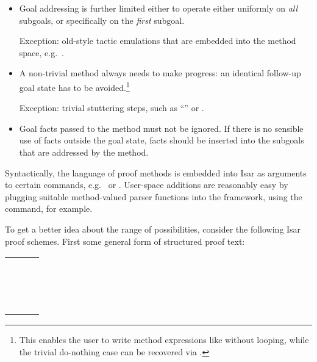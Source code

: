 \begin{isabellebody}
\begin{isamarkuptext}
  \begin{itemize}

  \item Goal addressing is further limited either to operate either
  uniformly on \emph{all} subgoals, or specifically on the
  \emph{first} subgoal.

  Exception: old-style tactic emulations that are embedded into the
  method space, e.g.\ \hyperlink{method.rule-tac}{\mbox{}}.

  \item A non-trivial method always needs to make progress: an
  identical follow-up goal state has to be avoided.\footnote{This
  enables the user to write method expressions like 
  without looping, while the trivial do-nothing case can be recovered
  via .}

  Exception: trivial stuttering steps, such as ``\hyperlink{method.-}{\mbox{\isa{{\isacharminus}}}}'' or
  \hyperlink{method.succeed}{\mbox{}}.

  \item Goal facts passed to the method must not be ignored.  If there
  is no sensible use of facts outside the goal state, facts should be
  inserted into the subgoals that are addressed by the method.

  \end{itemize}

  \medskip Syntactically, the language of proof methods is embedded
  into Isar as arguments to certain commands, e.g.\ \hyperlink{command.by}{\mbox{}} or
  \hyperlink{command.apply}{\mbox{}}.  User-space additions are reasonably easy by
  plugging suitable method-valued parser functions into the framework,
  using the \hyperlink{command.method-setup}{\mbox{}} command, for example.

  To get a better idea about the range of possibilities, consider the
  following Isar proof schemes.  First some general form of structured
  proof text:

  \medskip
  \begin{tabular}{l}
  \hyperlink{command.from}{\mbox{\isa{\isacommand{from}}}}~\isa{facts\isactrlsub {\isadigit{1}}}~\hyperlink{command.have}{\mbox{\isa{\isacommand{have}}}}~\isa{props}~\hyperlink{command.using}{\mbox{\isa{\isacommand{using}}}}~\isa{facts\isactrlsub {\isadigit{2}}} \\
  \hyperlink{command.proof}{\mbox{\isa{\isacommand{proof}}}}~\isa{{\isacharparenleft}initial{\isacharunderscore}method{\isacharparenright}} \\
  \quad\isa{body} \\
  \hyperlink{command.qed}{\mbox{\isa{\isacommand{qed}}}}~\isa{{\isacharparenleft}terminal{\isacharunderscore}method{\isacharparenright}} \\
  \end{tabular}
  \medskip


\end{isamarkuptext}
\end{isabellebody}

